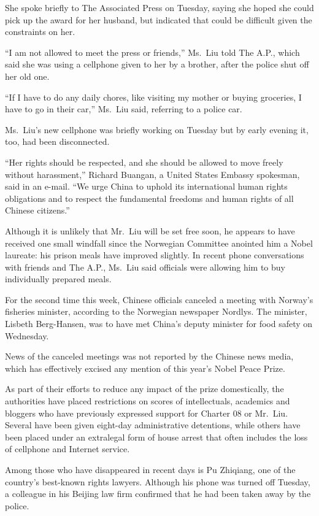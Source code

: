 ﻿\documentclass[12pt]{article}
\begin{document}
She spoke briefly to The Associated Press on Tuesday, saying she hoped she could pick up the award
for her husband, but indicated that could be difficult given the constraints on her.

``I am not allowed to meet the press or friends,'' Ms.~Liu told The A.P., which said she was using a
cellphone given to her by a brother, after the police shut off her old one.

``If I have to do any daily chores, like visiting my mother or buying groceries, I have to go in
their car,'' Ms.~Liu said, referring to a police car.

Ms.~Liu's new cellphone was briefly working on Tuesday but by early evening it, too, had been
disconnected.

``Her rights should be respected, and she should be allowed to move freely without harassment,''
Richard Buangan, a United States Embassy spokesman, said in an e-mail. ``We urge China to uphold its
international human rights obligations and to respect the fundamental freedoms and human rights of
all Chinese citizens.''

Although it is unlikely that Mr.~Liu will be set free soon, he appears to have received one small
windfall since the Norwegian Committee anointed him a Nobel laureate: his prison meals have improved
slightly. In recent phone conversations with friends and The A.P., Ms.~Liu said officials were
allowing him to buy individually prepared meals.

For the second time this week, Chinese officials canceled a meeting with Norway's fisheries
minister, according to the Norwegian newspaper Nordlys. The minister, Lisbeth Berg-Hansen, was to
have met China's deputy minister for food safety on Wednesday.

News of the canceled meetings was not reported by the Chinese news media, which has effectively
excised any mention of this year's Nobel Peace Prize.

As part of their efforts to reduce any impact of the prize domestically, the authorities have placed
restrictions on scores of intellectuals, academics and bloggers who have previously expressed
support for Charter 08 or Mr.~Liu. Several have been given eight-day administrative detentions,
while others have been placed under an extralegal form of house arrest that often includes the loss
of cellphone and Internet service.

Among those who have disappeared in recent days is Pu Zhiqiang, one of the country's best-known
rights lawyers. Although his phone was turned off Tuesday, a colleague in his Beijing law firm
confirmed that he had been taken away by the police.
\end{document}
